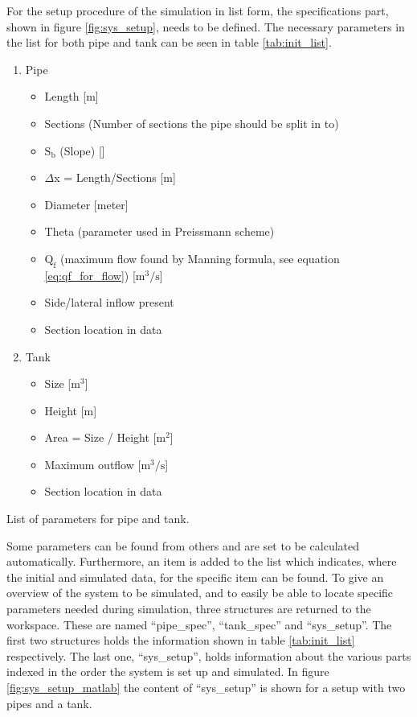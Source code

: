 For the setup procedure of the simulation in list form, the specifications part, shown in figure \ref{fig:sys_setup}, needs to be defined. The necessary parameters in the list for both pipe and tank can be seen in table \ref{tab:init_list}. 
\begin{table}[H]
\begin{enumerate} 
	\item Pipe
	\begin{itemize}
		\item Length [m]
		\item Sections (Number of sections the pipe should be split in to)
		\item $\text{S}_\text{b}$ (Slope) [\textperthousand]
		\item $\Delta$x = Length/Sections [m]
		\item Diameter [meter]
		\item Theta (parameter used in Preissmann scheme)
		\item $\text{Q}_{\text{f}}$ (maximum flow found by Manning formula, see equation \ref{eq:qf_for_flow}) [$\text{m}^\text{3}/\text{s}$]
		\item Side/lateral inflow present 
		\item Section location in data 
	\end{itemize}
	\item Tank
	\begin{itemize}
		\item Size [$\text{m}^\text{3}$]
		\item Height [m]
		\item Area = Size / Height [$\text{m}^\text{2}$]
		\item Maximum outflow [$\text{m}^\text{3}/\text{s}$]
		\item Section location in data 
	\end{itemize}
	
\end{enumerate}
\caption{List of parameters for pipe and tank.}
\label{tab:init_list}
\end{table}
Some parameters can be found from others and are set to be calculated automatically. 
Furthermore, an item is added to the list which indicates, where the initial and simulated data, for the specific item can be found.
To give an overview of the system to be simulated, and to easily be able to locate specific parameters needed during simulation, three structures are returned to the workspace. These are named ``pipe\_spec'', ``tank\_spec'' and ``sys\_setup''. The first two structures holds the information shown in table \ref{tab:init_list} respectively. The last one, ``sys\_setup'', holds information about the various parts indexed in the order the system is set up and simulated. In figure \ref{fig:sys_setup_matlab} the content of ``sys\_setup'' is shown for a setup with two pipes and a tank.

